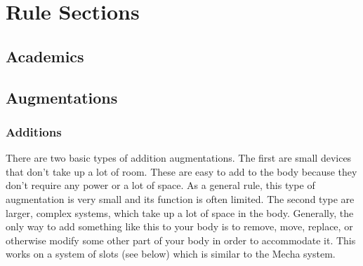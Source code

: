 \documentclass[twoside]{book}
\begin{document}
  
  

  

  
    

\part{Rule Sections}
    
    

\chapter{Academics}
    
    

\chapter{Augmentations}
    
    

\section{Additions}
     There are two basic types of addition augmentations.
             The first are small devices that don't take up a lot
             of room. These are easy to add to the body because they
             don't require any power or a lot of space. As a
             general rule, this type of augmentation is very small and
             its function is often limited.  The second type are larger, complex systems, which
             take up a lot of space in the body. Generally, the only way
             to add something like this to your body is to remove, move,
             replace, or otherwise modify some other part of your body in
             order to accommodate it. This works on a system of slots
             (see below) which is similar to the Mecha system. 
    
\end{document}
